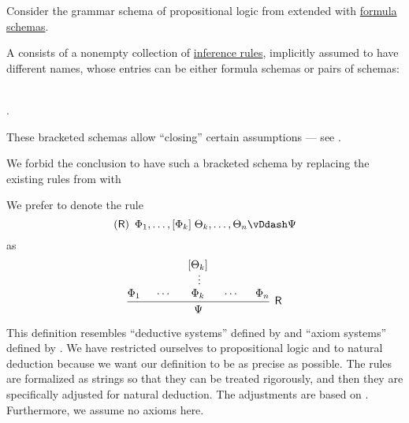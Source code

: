 \begin{definition}\label{def:propositional_natural_deduction_system}\mimprovised
  Consider the grammar schema of propositional logic from  extended with \hyperref[def:propositional_formula_schema]{formula schemas}.

  A  consists of a nonempty collection of \hyperref[def:inference_rule]{inference rules}, implicitly assumed to have different names, whose entries can be either formula schemas or pairs of schemas:
  \begin{bnf*}
     { \bnfor} \\
    .
  \end{bnf*}

  These bracketed schemas allow \enquote{closing} certain assumptions --- see .

  We forbid the conclusion to have such a bracketed schema by replacing the existing rules from  with
  \begin{bnf*}
     {}
  \end{bnf*}

  We prefer to denote the rule
  \begin{equation*}
    (\logic{R}) \enspace \Phi_1, \ldots, [\Phi_k] \thickspace \Theta_k, \ldots, \Theta_n \vDdash \Psi
  \end{equation*}
  as
  \begin{equation*}
    \begin{prooftree}
      \hypo{ \Phi_1 }
      \hypo{ \cdots }
      \hypo{ [\Theta_k] }
      \ellipsis {} { \Phi_k }
      \hypo{ \cdots }
      \hypo{ \Phi_n }
      \infer5[\logic{R}]{ \Psi }
    \end{prooftree}
  \end{equation*}
\end{definition}
\begin{comments}
  \item This definition resembles \enquote{deductive systems} defined by  and \enquote{axiom systems} defined by . We have restricted ourselves to propositional logic and to natural deduction because we want our definition to be as precise as possible. The rules are formalized as strings so that they can be treated rigorously, and then they are specifically adjusted for natural deduction. The adjustments are based on \cite[sec. 2.1]{TroelstraSchwichtenberg2000}. Furthermore, we assume no axioms here.
\end{comments}

